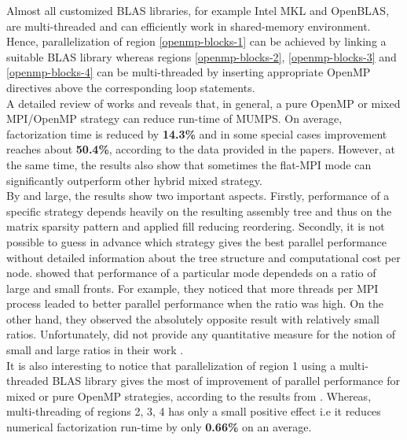 Almost all customized BLAS libraries, for example Intel MKL and OpenBLAS, are multi-threaded and can efficiently work in shared-memory environment. Hence, parallelization of region \ref{openmp-blocks-1} can be achieved by linking a suitable BLAS library whereas regions \ref{openmp-blocks-2}, \ref{openmp-blocks-3} and \ref{openmp-blocks-4} can be multi-threaded by inserting appropriate OpenMP directives above the corresponding loop statements.\\


A detailed review of works \cite{l2013introduction} and \cite{chowdhury2010some} reveals that, in general, a pure OpenMP or mixed MPI/OpenMP strategy can reduce run-time of MUMPS. On average, factorization time is reduced by \textbf{14.3\%} and in some special cases improvement reaches about \textbf{50.4\%}, according to the data provided in the papers. However, at the same time, the results also show that sometimes the flat-MPI mode can significantly outperform other hybrid mixed strategy.\\


By and large, the results show two important aspects. Firstly, performance of a specific strategy depends heavily on the resulting assembly tree and thus on the matrix sparsity pattern and applied fill reducing reordering. Secondly, it is not possible to guess in advance which strategy gives the best parallel performance without detailed information about the tree structure and computational cost per node. \citeauthor{l2013introduction} showed that performance of a particular mode dependeds on a ratio of large and small fronts. For example, they noticed that more threads per MPI process leaded to better parallel performance when the ratio was high. On the other hand, they observed the absolutely opposite result with relatively small ratios. Unfortunately, \citeauthor{l2013introduction} did not provide any quantitative measure for the notion of small and large ratios in their work \cite{l2013introduction}.\\ 


It is also interesting to notice that parallelization of region 1 using a multi-threaded BLAS library gives the most of improvement of parallel performance for mixed or pure OpenMP strategies, according to the results from \cite{l2013introduction}. Whereas,
multi-threading of regions 2, 3, 4 has only a small positive effect i.e it reduces numerical factorization run-time by only \textbf{0.66\%} on an average.\\




